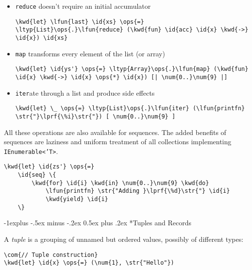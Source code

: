 \documentclass[10pt,landscape]{article}
\makeatletter
\renewcommand{\subsection}{\@startsection{subsection}{2}{0mm}%
                                {-1explus -.5ex minus -.2ex}%
                                {0.5ex plus .2ex}%
                                {\normalfont\normalsize\bfseries}}
\newcommand{\id}[1]{\textcolor[HTML]{000000}{#1}}
\newcommand{\str}[1]{\textcolor[HTML]{A31515}{#1}}
\newcommand{\kwd}[1]{\textcolor[HTML]{0000FF}{#1}}
\newcommand{\com}[1]{\textcolor[HTML]{008000}{#1}}
\newcommand{\ops}[1]{\textcolor[HTML]{000000}{#1}}
\newcommand{\num}[1]{\textcolor[HTML]{000000}{#1}}
\newcommand{\ltyp}[1]{\textcolor[HTML]{2B91AF}{#1}}
\newcommand{\lfun}[1]{\textcolor[HTML]{AA5500}{#1}}
\newcommand{\lprf}[1]{\textcolor[HTML]{2B91AF}{#1}}
\makeatother
\begin{document}
\begin{multicols}{3}
\begin{itemize}
\item 

\texttt{reduce} doesn't require an initial accumulator
\begin{Verbatim}[commandchars=\\\{\}]
\kwd{let} \lfun{last} \id{xs} \ops{=} \ltyp{List}\ops{.}\lfun{reduce} (\kwd{fun} \id{acc} \id{x} \kwd{->} \id{x}) \id{xs}
\end{Verbatim}


\item 

\texttt{map} transforms every element of the list (or array)
\begin{Verbatim}[commandchars=\\\{\}]
\kwd{let} \id{ys'} \ops{=} \ltyp{Array}\ops{.}\lfun{map} (\kwd{fun} \id{x} \kwd{->} \id{x} \ops{*} \id{x}) [| \num{0..}\num{9} |]
\end{Verbatim}


\item 

\texttt{iter}ate through a list and produce side effects
\begin{Verbatim}[commandchars=\\\{\}]
\kwd{let} \_ \ops{=} \ltyp{List}\ops{.}\lfun{iter} (\lfun{printfn} \str{"}\lprf{\%i}\str{"}) [ \num{0..}\num{9} ] 
\end{Verbatim}


\end{itemize}



All these operations are also available for sequences. The added benefits of sequences are laziness and uniform treatment of all collections implementing \texttt{IEnumerable<'T>}.
\begin{Verbatim}[commandchars=\\\{\}]
\kwd{let} \id{zs'} \ops{=}
    \id{seq} \{ 
        \kwd{for} \id{i} \kwd{in} \num{0..}\num{9} \kwd{do}
            \lfun{printfn} \str{"Adding }\lprf{\%d}\str{"} \id{i}
            \kwd{yield} \id{i}
    \}

\end{Verbatim}

\subsection*{Tuples and Records}



A \emph{tuple} is a grouping of unnamed but ordered values, possibly of different types:
\begin{Verbatim}[commandchars=\\\{\}]
\com{// Tuple construction}
\kwd{let} \id{x} \ops{=} (\num{1}, \str{"Hello"})


\end{Verbatim}
\end{multicols}
\end{document}
